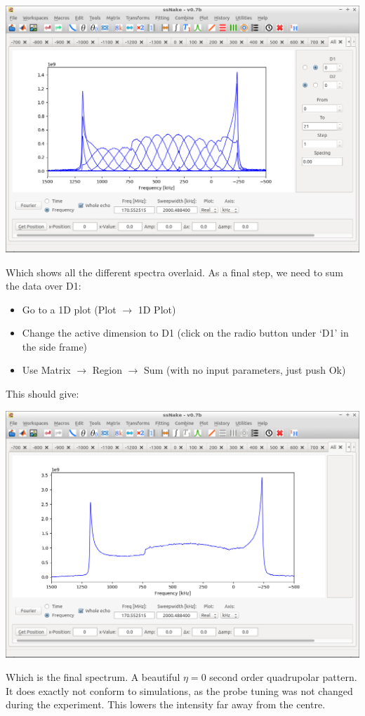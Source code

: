 \documentclass[11pt,a4paper]{article}
\begin{document}
\begin{center}
\includegraphics[width=0.8\linewidth]{Figs/Fig3.png}
\end{center}

Which shows all the different spectra overlaid. As a final step, we need to sum the data over D1:
\begin{itemize}
\item Go to a 1D plot (Plot $\longrightarrow$ 1D Plot)
\item Change the active dimension to D1 (click on the radio button under `D1' in the side frame)
\item Use Matrix $\longrightarrow$ Region $\longrightarrow$ Sum (with no input parameters, just push
  Ok)
\end{itemize}
This should give:
\begin{center}
\includegraphics[width=0.8\linewidth]{Figs/Fig4.png}
\end{center}
Which is the final spectrum. A beautiful $\eta = 0$ second order quadrupolar pattern. It does
exactly not conform to simulations, as the probe tuning was not changed during the experiment. This
lowers the intensity far away from the centre.
\end{document}
